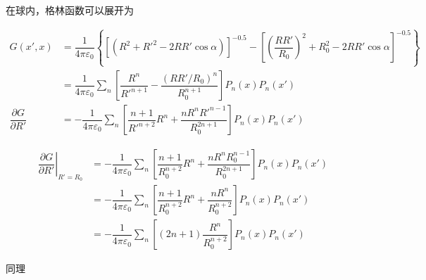 \documentclass{article}
\begin{document}
在球内，格林函数可以展开为

\begin{equation*}
  \begin{aligned}
    G \left( x', x \right) &= 
      \dfrac{1}{4\pi \varepsilon_0} \left\{ \left[ \left( R^2 + R'^2 - 2 R R' \cos \alpha \right) \right]^{-0.5} -
      \left[ \left( \dfrac{R R'}{R_0}  \right)^2 + R_0^2 - 2 RR' \cos \alpha \right]^{-0.5}
    \right\} \\
    &= \dfrac{1}{4\pi \varepsilon_0} \sum_n \left[ \dfrac{R^n}{R'^{n+1}} - \dfrac{\left( RR'/R_0 \right)^n}{R_0^{n+1}}   \right] P_n \left( x \right) P_n \left( x' \right) \\
    \dfrac{\partial G}{\partial R'} &=
    - \dfrac{1}{4\pi \varepsilon_0} \sum_n \left[ \dfrac{n+1}{R'^{n+2}} R^n + \dfrac{nR^n R'^{n-1}}{R_0^{2n+1}} \right] P_n \left( x \right) P_n \left( x' \right)
  \end{aligned}
\end{equation*}

\begin{equation*}
  \begin{aligned}
    \left. \dfrac{\partial G}{\partial R'} \right|_{R'=R_0} &=
    - \dfrac{1}{4\pi \varepsilon_0} \sum_n \left[ \dfrac{n+1}{R_0^{n+2}} R^n + \dfrac{nR^n R_0^{n-1}}{R_0^{2n+1}} \right] P_n \left( x \right) P_n \left( x' \right) \\
    &= - \dfrac{1}{4\pi \varepsilon_0} \sum_n \left[ \dfrac{n+1}{R_0^{n+2}} R^n + \dfrac{nR^n }{R_0^{n+2}} \right] P_n \left( x \right) P_n \left( x' \right) \\
    &= - \dfrac{1}{4\pi \varepsilon_0} \sum_n \left[ \left( 2n+1 \right) \dfrac{R^n }{R_0^{n+2}} \right] P_n \left( x \right) P_n \left( x' \right)
  \end{aligned}
\end{equation*}

同理
\end{document}
